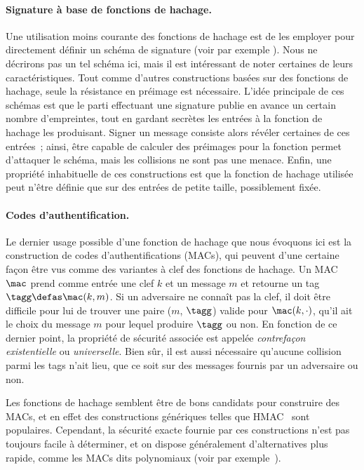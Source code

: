 \paragraph{Signature à base de fonctions de hachage.}
Une utilisation moins courante des fonctions de hachage est de les employer pour directement définir un schéma de signature
(voir par exemple \cite{DBLP:conf/crypto/Merkle87}). Nous ne décrirons pas un tel schéma ici, mais il est intéressant de noter certaines
de leurs caractéristiques.
Tout comme d'autres constructions basées sur des fonctions de hachage, seule la résistance en préimage est nécessaire.
L'idée principale de ces schémas est que le parti effectuant une signature publie en avance un certain nombre d'empreintes, tout en gardant
secrètes les entrées à la fonction de hachage les produisant. Signer un message consiste alors révéler certaines de ces entrées~; ainsi, être capable
de calculer des préimages pour la fonction permet d'attaquer le schéma, mais les collisions ne sont pas une menace.
Enfin, une propriété inhabituelle de ces constructions est que la fonction de hachage utilisée peut n'être définie que sur des entrées de petite
taille, possiblement fixée.

\paragraph{Codes d'authentification.}
Le dernier usage possible d'une fonction de hachage que nous évoquons ici est la construction de codes d'authentifications (MACs),
qui peuvent d'une certaine façon être vus comme des variantes à clef des fonctions de hachage.
Un MAC $\mac$ prend comme entrée une clef $k$ et un message $m$ et retourne un tag
$\tagg \defas \mac(k, m)$.
Si un adversaire ne connaît pas la clef, il doit être difficile pour lui de trouver une paire ($m$, $\tagg$) valide pour
$\mac(k, \cdot)$, qu'il ait le choix du message $m$ pour lequel produire $\tagg$ ou non.
En fonction de ce dernier point, la propriété de sécurité associée est appelée \emph{contrefaçon existentielle} ou \emph{universelle}.
Bien sûr, il est aussi nécessaire qu'aucune collision parmi les tags n'ait lieu, que ce soit sur des messages fournis par un adversaire ou non.

Les fonctions de hachage semblent être de bons candidats pour construire des MACs, et en effet des constructions génériques telles que 
HMAC~\cite{DBLP:conf/crypto/BellareCK96} sont populaires. Cependant, la sécurité exacte fournie par ces constructions n'est pas toujours facile à déterminer,
et on dispose généralement d'alternatives plus rapide, comme les MACs dits polynomiaux
(voir par exemple~\cite{DBLP:conf/crypto/BlackHKKR99}).

